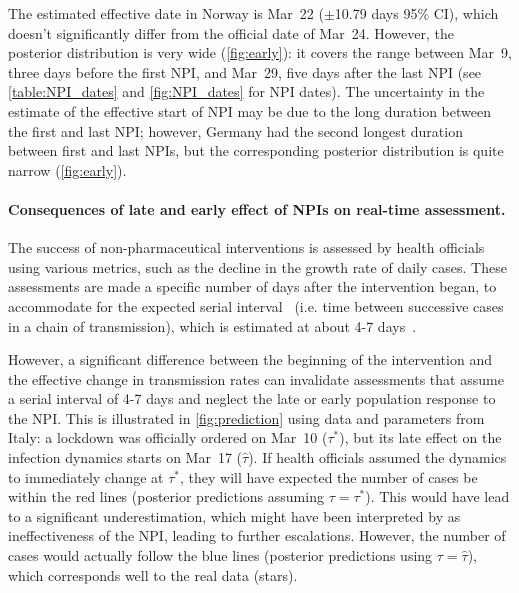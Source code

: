 \documentclass[12pt]{extarticle}
\begin{document}
The estimated effective date in Norway is Mar~22 ($\pm$10.79 days 95\% CI), which doesn't significantly differ from the official date of Mar~24.
However, the posterior distribution is very wide (\autoref{fig:early}): it covers the range between Mar~9, three days before the first NPI, and Mar~29, five days  after the last NPI (see 
\autoref{table:NPI_dates} and \autoref{fig:NPI_dates} for NPI dates).
The uncertainty in the estimate of the effective start of NPI may be due to the long duration between the first and last NPI; however, Germany had the second longest duration between first and last NPIs, but the corresponding posterior distribution is quite narrow (\autoref{fig:early}).


\paragraph*{Consequences of late and early effect of NPIs on real-time assessment.}

The success of non-pharmaceutical interventions is assessed by health officials using various metrics, such as the decline in the growth rate of daily cases. These assessments are made a specific number of days after the intervention began, to accommodate for the expected serial interval~\citep{Banholzer2020} (i.e. time between successive cases in a chain of transmission), which is estimated at about 4-7 days~\citep{Gatto2020}. %

However, a significant difference between the beginning of the intervention and the effective change in transmission rates can invalidate assessments that assume a serial interval of 4-7 days and neglect the late or early population response to the NPI.
This is illustrated in \autoref{fig:prediction} using data and parameters from Italy: a lockdown was officially ordered on Mar~10 ($\tau^*$), but its late effect on the infection dynamics starts on Mar~17 ($\hat{\tau}$). If health officials assumed the dynamics to immediately change at $\tau^*$, they will have expected the number of cases be within the red lines (posterior predictions assuming $\tau=\tau^*$).
This would have lead to a significant underestimation, which might have been interpreted by as ineffectiveness of the NPI, leading to further escalations.
However, the number of cases would actually follow the blue lines (posterior predictions using $\tau=\hat{\tau}$), which corresponds well to the real data (stars).
\end{document}
